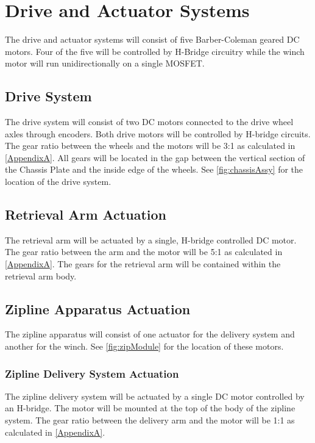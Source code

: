 \documentclass[11pt, oneside]{article} %
\begin{document}
	\newpage
	
\section{Drive and Actuator Systems}
The drive and actuator systems will consist of five Barber-Coleman geared DC motors. Four of the five will be controlled by H-Bridge circuitry while the winch motor will run unidirectionally on a single MOSFET.

	\subsection{Drive System}
	The drive system will consist of two DC motors connected to the drive wheel axles through encoders. Both drive motors will be controlled by H-bridge circuits. The gear ratio between the wheels and the motors will be 3:1 as calculated in \autoref{AppendixA}. All gears will be located in the gap between the vertical section of the Chassis Plate and the inside edge of the wheels. See \autoref{fig:chassisAssy} for the location of the drive system.
	
	\subsection{Retrieval Arm Actuation}
	The retrieval arm will be actuated by a single, H-bridge controlled DC motor. The gear ratio between the arm and the motor will be 5:1 as calculated in \autoref{AppendixA}. The gears for the retrieval arm will be contained within the retrieval arm body.
	
	\subsection{Zipline Apparatus Actuation}
	The zipline apparatus will consist of one actuator for the delivery system and another for the winch. See \autoref{fig:zipModule} for the location of these motors.
		
		\subsubsection{Zipline Delivery System Actuation}
		The zipline delivery system will be actuated by a single DC motor controlled by an H-bridge. The motor will be mounted at the top of the body of the zipline system. The gear ratio between the delivery arm and the motor will be 1:1 as calculated in \autoref{AppendixA}.
		
\end{document}
